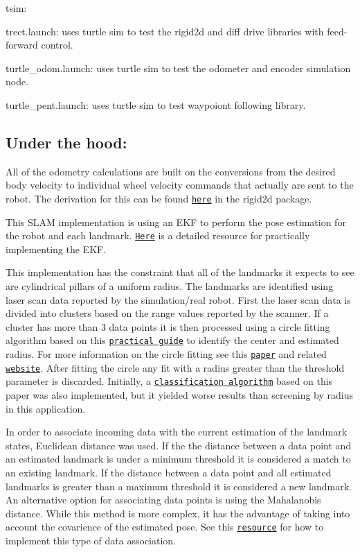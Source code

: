 {\ttfamily tsim}\+:
\begin{DoxyItemize}
\item {\ttfamily trect.\+launch}\+: uses turtle sim to test the rigid2d and diff drive libraries with feed-\/forward control.
\item {\ttfamily turtle\+\_\+odom.\+launch}\+: uses turtle sim to test the odometer and encoder simulation node.
\item {\ttfamily turtle\+\_\+pent.\+launch}\+: uses turtle sim to test waypoiont following library.
\end{DoxyItemize}

\subsection*{Under the hood\+:}

All of the odometry calculations are built on the conversions from the desired body velocity to individual wheel velocity commands that actually are sent to the robot. The derivation for this can be found \href{nuturtle_robot/doc/Kinematics.pdf}{\tt here} in the rigid2d package.

This S\+L\+AM implementation is using an E\+KF to perform the pose estimation for the robot and each landmark. \href{https://nu-msr.github.io/navigation_site/slam.pdf}{\tt Here} is a detailed resource for practically implementing the E\+KF.

This implementation has the constraint that all of the landmarks it expects to see are cylindrical pillars of a uniform radius. The landmarks are identified using laser scan data reported by the simulation/real robot. First the laser scan data is divided into clusters based on the range values reported by the scanner. If a cluster has more than 3 data points it is then processed using a circle fitting algorithm based on this \href{https://nu-msr.github.io/navigation_site/circle_fit.html}{\tt practical guide} to identify the center and estimated radius. For more information on the circle fitting see this \href{https://projecteuclid.org/euclid.ejs/1251119958}{\tt paper} and related \href{https://people.cas.uab.edu/~mosya/cl/CPPcircle.html}{\tt website}. After fitting the circle any fit with a radius greater than the threshold parameter is discarded. Initially, a \href{http://miarn.sourceforge.net/pdf/a1738b.pdf}{\tt classification algorithm} based on this paper was also implemented, but it yielded worse results than screening by radius in this application.

 In order to associate incoming data with the current estimation of the landmark states, Euclidean distance was used. If the the distance between a data point and an estimated landmark is under a minimum threshold it is considered a match to an existing landmark. If the distance between a data point and all estimated landmarks is greater than a maximum threshold it is considered a new landmark. An alternative option for associating data points is using the Mahalanobis distance. While this method is more complex, it has the advantage of taking into account the covarience of the estimated pose. See this \href{https://nu-msr.github.io/navigation_site/data_assoc.html}{\tt resource} for how to implement this type of data association. 